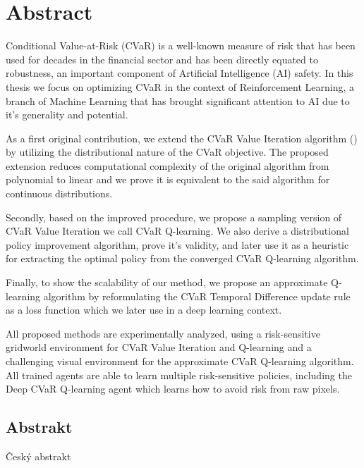 \begingroup
\let\clearpage\relax
\let\cleardoublepage\relax
\let\cleardoublepage\relax

\chapter*{Abstract}


Conditional Value-at-Risk (CVaR) is a well-known measure of risk that has been used for decades in the financial sector and has been directly equated to robustness, an important component of Artificial Intelligence (AI) safety. In this thesis we focus on optimizing CVaR in the context of Reinforcement Learning, a branch of Machine Learning that has brought significant attention to AI due to it's generality and potential.

As a first original contribution, we extend the CVaR Value Iteration algorithm (\citet{chow2015risk}) by utilizing the distributional nature of the CVaR objective. The proposed extension reduces computational complexity of the original algorithm from polynomial to linear and we prove it is equivalent to the said algorithm for continuous distributions.

Secondly, based on the improved procedure, we propose a sampling version of CVaR Value Iteration we call CVaR Q-learning. We also derive a distributional policy improvement algorithm, prove it's validity, and later use it as a heuristic for extracting the optimal policy from the converged CVaR Q-learning algorithm.

Finally, to show the scalability of our method, we propose an approximate Q-learning algorithm by reformulating the CVaR Temporal Difference update rule as a loss function which we later use in a deep learning context.

All proposed methods are experimentally analyzed, using a risk-sensitive gridworld environment for CVaR Value Iteration and Q-learning and a challenging visual environment for the approximate CVaR Q-learning algorithm. All trained agents are able to learn multiple risk-sensitive policies, including the  Deep CVaR Q-learning agent which learns how to avoid risk from raw pixels.



\vfill

\begin{otherlanguage}{czech}
\chapter*{Abstrakt}
Český abstrakt
\end{otherlanguage}

\endgroup

\vfill

